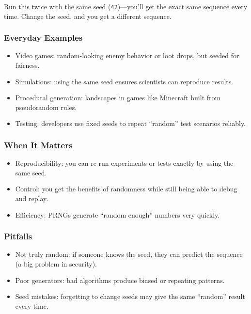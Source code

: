 \documentclass[
  letterpaper,
  DIV=11,
  numbers=noendperiod]{scrreprt}
\providecommand{\tightlist}{%
  \setlength{\itemsep}{0pt}\setlength{\parskip}{0pt}}
\begin{document}
Run this twice with the same seed (\texttt{42})---you'll get the exact
same sequence every time. Change the seed, and you get a different
sequence.

\subsubsection{Everyday Examples}\label{everyday-examples-24}

\begin{itemize}
\tightlist
\item
  Video games: random-looking enemy behavior or loot drops, but seeded
  for fairness.
\item
  Simulations: using the same seed ensures scientists can reproduce
  results.
\item
  Procedural generation: landscapes in games like Minecraft built from
  pseudorandom rules.
\item
  Testing: developers use fixed seeds to repeat ``random'' test
  scenarios reliably.
\end{itemize}

\subsubsection{When It Matters}\label{when-it-matters-23}

\begin{itemize}
\tightlist
\item
  Reproducibility: you can re-run experiments or tests exactly by using
  the same seed.
\item
  Control: you get the benefits of randomness while still being able to
  debug and replay.
\item
  Efficiency: PRNGs generate ``random enough'' numbers very quickly.
\end{itemize}

\subsubsection{Pitfalls}\label{pitfalls-22}

\begin{itemize}
\tightlist
\item
  Not truly random: if someone knows the seed, they can predict the
  sequence (a big problem in security).
\item
  Poor generators: bad algorithms produce biased or repeating patterns.
\item
  Seed mistakes: forgetting to change seeds may give the same ``random''
  result every time.
\end{itemize}
\end{document}
